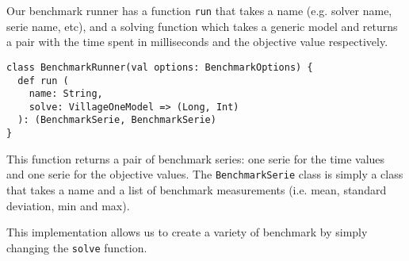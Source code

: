 \documentclass[../thesis.tex]{subfiles}
\begin{document}
Our benchmark runner has a function \texttt{run} that takes a name (e.g. solver name, serie name, etc), and a solving function 
which takes a generic model and returns a pair with the time spent in milliseconds and the objective value respectively.

\begin{lstlisting}[style=scalaStyle,label={benchmark:run},caption={Benchmark run function},captionpos=b]
class BenchmarkRunner(val options: BenchmarkOptions) {
  def run (
    name: String, 
    solve: VillageOneModel => (Long, Int)
  ): (BenchmarkSerie, BenchmarkSerie)
}
\end{lstlisting}

This function returns a pair of benchmark series: one serie for the time values and one serie for the objective values.
The \texttt{BenchmarkSerie} class is simply a class that takes a name and a list of benchmark measurements (i.e. mean, standard deviation, min and max).

This implementation allows us to create a variety of benchmark by simply changing the \texttt{solve} function.
\end{document}
